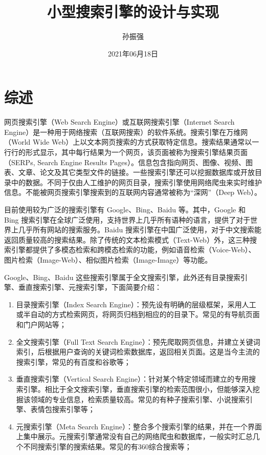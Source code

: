 \documentclass{ctexart}
\title{小型搜索引擎的设计与实现}
\author{孙振强}
\date{2021年06月18日}
\begin{document}
    \maketitle
    \newpage

    \tableofcontents
    \newpage


    \section{综述}\label{sec:introduction}

    网页搜索引擎（Web Search Engine）或互联网搜索引擎（Internet Search Engine）是一种用于网络搜索（互联网搜索）的软件系统。搜索引擎在万维网（World Wide Web）上以文本网页搜索的方式获取特定信息。搜索结果通常以一行行的形式显示，其中每行结果为一个网页，该页面被称为搜索引擎结果页面（SERPs, Search Engine Results Pages）。信息包含指向网页、图像、视频、图表、文章、论文及其它类型文件的链接。一些搜索引擎还可以挖掘数据库或开放目录中的数据。不同于仅由人工维护的网页目录，搜索引擎使用网络爬虫来实时维护信息。不能被网页搜索引擎搜索到的互联网内容通常被称为“深网”（Deep Web）\cite{wikipedia-search-engine}。

    目前使用较为广泛的搜索引擎有 Google、Bing、Baidu 等。其中，Google 和 Bing 搜索引擎在全球广泛使用，支持世界上几乎所有语种的语言，提供了对于世界上几乎所有网站的搜索服务。Baidu 搜索引擎在中国广泛使用，对于中文搜索能返回质量较高的搜索结果。除了传统的文本检索模式（Text-Web）外，这三种搜索引擎都提供了多模态检索和跨模态检索的功能，例如语音检索（Voice-Web）、图片检索（Image-Web）、相似图片检索（Image-Image）等功能。

    Google、Bing、Baidu 这些搜索引擎属于全文搜索引擎，此外还有目录搜索引擎、垂直搜索引擎、元搜索引擎\cite{baike-search-engine}，下面简要介绍：

    \begin{enumerate}
        \item 目录搜索引擎（Index Search Engine）：预先设有明确的层级框架，采用人工或半自动的方式检索网页，将网页归档到相应的的目录下。常见的有导航页面和门户网站等；
        \item 全文搜索引擎（Full Text Search Engine）：预先爬取网页信息，并建立关键词索引，后根据用户查询的关键词检索数据库，返回相关页面。这是当今主流的搜索引擎，常见的有百度和谷歌等；
        \item 垂直搜索引擎（Vertical Search Engine）：针对某个特定领域而建立的专用搜索引擎。相比于全文搜索引擎，垂直搜索引擎的检索范围很小，但能够深入挖掘该领域的专业信息，检索质量较高。常见的有种子搜索引擎、小说搜索引擎、表情包搜索引擎等；
        \item 元搜索引擎（Meta Search Engine）：整合多个搜索引擎的结果，并在一个界面上集中展示。元搜索引擎通常没有自己的网络爬虫和数据库，一般实时汇总几个不同搜索引擎的搜索结果。常见的有360综合搜索等；
    \end{enumerate}
\end{document}
